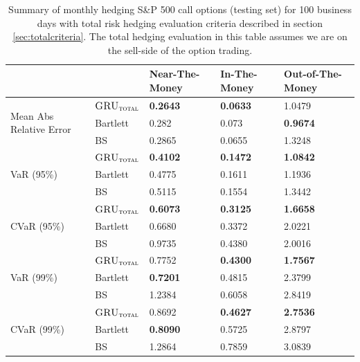 \documentclass[letterpaper,12pt,titlepage,oneside,final]{book}
\numberwithin{equation}{section}
\theoremstyle{definition}
\newcommand{\modelT}{\textsc{GRU}_{\textsc{total}}}
\begin{document}
\begin{table}[htp!]
	\centering
	\begin{tabular}{ll|l|l|l|}
		\cline{3-5}
		&          & Near-The-Money   & In-The-Money     & Out-of-The-Money \\ \hline
		\multicolumn{1}{|l|}{\multirow{3}{*}{Mean Abs Relative Error}} & $\modelT$    & \textbf{0.2643}  & \textbf{0.0633}  & 1.0479           \\  
		\multicolumn{1}{|l|}{}                                & Bartlett & 0.282            & 0.073            & \textbf{0.9674}  \\  
		\multicolumn{1}{|l|}{}                                & BS       & 0.2865           & 0.0655           & 1.3248           \\ \hline
		\multicolumn{1}{|l|}{\multirow{3}{*}{VaR (95\%)}}     & $\modelT$    & \textbf{0.4102}          & \textbf{0.1472}          & \textbf{1.0842}          \\  
		\multicolumn{1}{|l|}{}                                & Bartlett & 0.4775          & 0.1611          & 1.1936          \\  
		\multicolumn{1}{|l|}{}                                & BS       & 0.5115          & 0.1554          & 1.3442          \\ \hline
		\multicolumn{1}{|l|}{\multirow{3}{*}{CVaR (95\%)}}    & $\modelT$    & \textbf{0.6073} & \textbf{0.3125} & \textbf{1.6658} \\  
		\multicolumn{1}{|l|}{}                                & Bartlett & 0.6680          & 0.3372          & 2.0221          \\  
		\multicolumn{1}{|l|}{}                                & BS       & 0.9735          & 0.4380          & 2.0016          \\ \hline
		\multicolumn{1}{|l|}{\multirow{3}{*}{VaR (99\%)}}     & $\modelT$    & 0.7752          & \textbf{0.4300} & \textbf{1.7567} \\  
		\multicolumn{1}{|l|}{}                                & Bartlett & \textbf{0.7201} & 0.4815          & 2.3799          \\  
		\multicolumn{1}{|l|}{}                                & BS       & 1.2384          & 0.6058          & 2.8419          \\ \hline
		\multicolumn{1}{|l|}{\multirow{3}{*}{CVaR (99\%)}}    & $\modelT$    & 0.8692          & \textbf{0.4627} & \textbf{2.7536}          \\  
		\multicolumn{1}{|l|}{}                                & Bartlett & \textbf{0.8090}  & 0.5725          & 2.8797          \\  
		\multicolumn{1}{|l|}{}                                & BS       & 1.2864          & 0.7859          & 3.0839          \\ \hline
	\end{tabular}
	\caption{Summary of monthly hedging S\&P 500 call options (testing set) for 100 business days with total risk hedging evaluation criteria described in  section \ref{sec:totalcriteria}. The total hedging evaluation in this table assumes we are on the sell-side of the option trading.} \label{table:CallTotalM}
\end{table}
\end{document}

